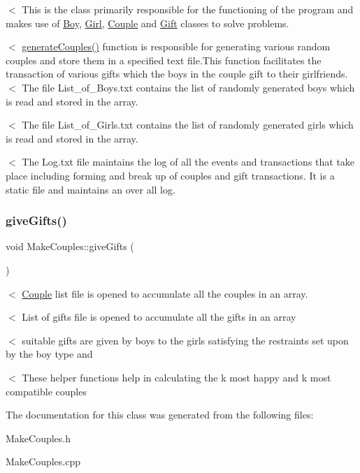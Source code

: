 $<$ This is the class primarily responsible for the functioning of the program and makes use of \hyperlink{class_boy}{Boy}, \hyperlink{class_girl}{Girl}, \hyperlink{class_couple}{Couple} and \hyperlink{class_gift}{Gift} classes to solve problems. 

$<$ \hyperlink{class_make_couples_ada939d38013b761a0745620ce2e57195}{generate\+Couples()} function is responsible for generating various random couples and store them in a specified text file.\+This function facilitates the transaction of various gifts which the boys in the couple gift to their girlfriends. $<$ The file List\+\_\+of\+\_\+\+Boys.\+txt contains the list of randomly generated boys which is read and stored in the array.

$<$ The file List\+\_\+of\+\_\+\+Girls.\+txt contains the list of randomly generated girls which is read and stored in the array.

$<$ The Log.\+txt file maintains the log of all the events and transactions that take place including forming and break up of couples and gift transactions. It is a static file and maintains an over all log. \mbox{\label{class_make_couples_a55984a015f74fa6752dba1d9e014ba58}} 
\subsubsection{\texorpdfstring{give\+Gifts()}{giveGifts()}}
{\footnotesize\ttfamily void Make\+Couples\+::give\+Gifts (\begin{DoxyParamCaption}{ }\end{DoxyParamCaption})}

$<$ \hyperlink{class_couple}{Couple} list file is opened to accumulate all the couples in an array.

$<$ List of gifts file is opened to accumulate all the gifts in an array

$<$ suitable gifts are given by boys to the girls satisfying the restraints set upon by the boy type and

$<$ These helper functions help in calculating the k most happy and k most compatible couples 

The documentation for this class was generated from the following files\+:\begin{DoxyCompactItemize}
\item 
Make\+Couples.\+h\item 
Make\+Couples.\+cpp\end{DoxyCompactItemize}
